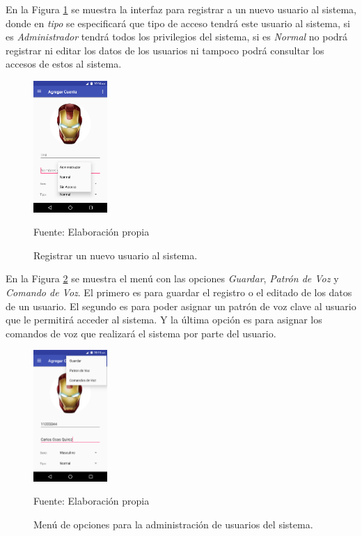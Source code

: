 En la Figura \ref{fig:figura3.41} se muestra la interfaz para registrar a un nuevo usuario al sistema, donde en \textit{tipo} se especificará que tipo de acceso tendrá este usuario al sistema, si es \textit{Administrador} tendrá todos los privilegios del sistema, si es \textit{Normal} no podrá registrar ni editar los datos de los usuarios ni tampoco podrá consultar los accesos de estos al sistema.
\begin{figure}[H]
\captionsetup{justification=centering}
\begin{center}
\includegraphics[width=0.25\textwidth]{Imagenes/Cap3/image041}
\end{center}
\begin{center}
\vskip -0.5cm
\caption{\small{Registrar un nuevo usuario al sistema.}}
\label{fig:figura3.41}
{\small{Fuente: Elaboración propia}}
\end{center}
\end{figure}

En la Figura \ref{fig:figura3.42} se muestra el menú con las opciones \textit{Guardar}, \textit{Patrón de Voz} y \textit{Comando de Voz}. El primero es para guardar el registro o el editado de los datos de un usuario. El segundo es para poder asignar un patrón de voz clave al usuario que le permitirá acceder al sistema. Y la última opción es para asignar los comandos de voz que realizará el sistema por parte del usuario.
\begin{figure}[H]
\captionsetup{justification=centering}
\begin{center}
\includegraphics[width=0.25\textwidth]{Imagenes/Cap3/image042}
\end{center}
\begin{center}
\vskip -0.5cm
\caption{\small{Menú de opciones para la administración de usuarios del sistema.}}
\label{fig:figura3.42}
{\small{Fuente: Elaboración propia}}
\end{center}
\end{figure}

